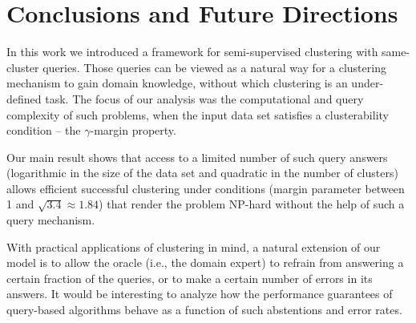 \documentclass[12pt]{article}
\begin{document}
\section{Conclusions and Future Directions}
In this work we introduced a framework for semi-supervised clustering with same-cluster queries. Those queries can be viewed as a natural way for a clustering mechanism to gain domain knowledge, without which clustering is an under-defined task. The focus of our analysis was the computational and query complexity of %
such problems, when the input data set satisfies a clusterability condition -- the $\gamma$-margin property.

Our main result shows that access to a limited number of such query answers (logarithmic in the size of the data set and quadratic in the number of clusters) allows efficient successful clustering under conditions (margin parameter between 1 and $\sqrt{3.4} \approx 1.84$) that render the problem NP-hard without the help of such a query mechanism.  
 
With practical applications of clustering in mind, a natural extension of our model is to allow the oracle (i.e., the domain expert) to refrain from answering a certain fraction of the queries, or to make a certain number of errors in its answers. It would be interesting to analyze how the performance guarantees of query-based algorithms behave as a function of such abstentions and error rates. 

\ifdefined\COMPLETE
\else
\end{document}
